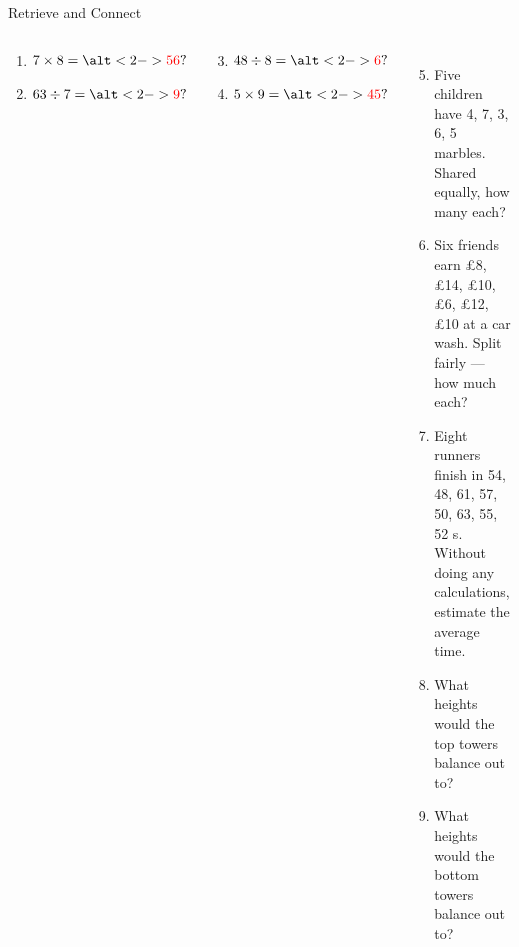 \documentclass{beamer}
\newcommand{\ashow}[1]{\uncover<2->{\textcolor{red}{\small #1}}}
\newcommand{\ashowq}[1]{\alt<2->{\textcolor{red}{\small #1}}{?}}
\begin{document}
\begin{frame}{Retrieve and Connect}
\begin{columns}[T]
\footnotesize
\vspace{0.2em}
  \begin{multicols}{2}
  \begin{enumerate}
    \item $7 \times 8 = \ashowq{56}$
    \item $63 \div 7 = \ashowq{9}$
    \end{enumerate}
  \end{multicols}
  \begin{multicols}{2}
  \begin{enumerate}
  \setcounter{enumi}{2}
    \item $48 \div 8 = \ashowq{6}$
    \item $5 \times 9 = \ashowq{45}$
    \end{enumerate}
  \end{multicols}
  \begin{enumerate}
  \setcounter{enumi}{4}
  \item Five children have 4, 7, 3, 6, 5 marbles. Shared equally, how many each? \ashow{5 marbles}
  \item Six friends earn £8, £14, £10, £6, £12, £10 at a car wash. Split fairly — how much each? \ashow{\pounds10 each}
  \item Eight runners finish in 54, 48, 61, 57, 50, 63, 55, 52 s. Without doing any calculations, estimate the average time. \ashow{about 55 s}
  \item What heights would the top towers balance out to? \ashow{5 bricks high}
  \item What heights would the bottom towers balance out to? \ashow{4 bricks high}
\end{enumerate}

\end{columns}
\end{frame}
\end{document}
